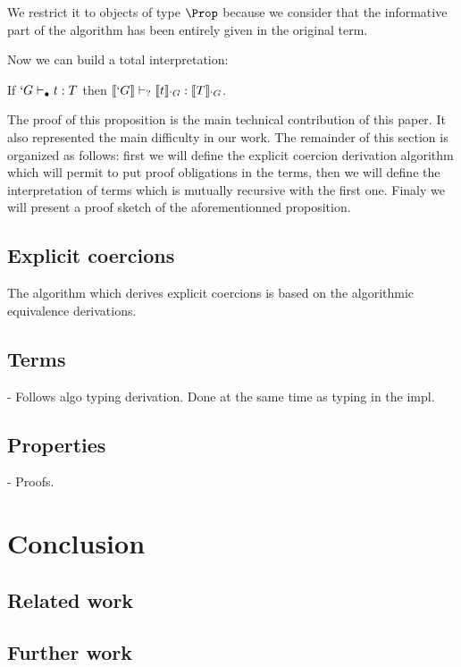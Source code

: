 \documentclass{llncs}
\begin{document}
We restrict it to objects of type $\Prop$ because we consider that the
informative part of the algorithm has been entirely given in the
original term. 

Now we can build a total interpretation:
\begin{proposition}
  If $`G \vdash_{\bullet} t : T$ then $\llbracket `G \rrbracket \vdash_{?} \llbracket t \rrbracket_{`G} : \llbracket T \rrbracket_{`G}$.
\end{proposition}

The proof of this proposition is the main technical contribution of this
paper. It also represented the main difficulty in our work. 
The remainder of this section is organized as follows: first we will
define the explicit coercion derivation algorithm which will permit to
put proof obligations in the terms, then we will define the
interpretation of terms which is mutually recursive with the first
one. Finaly we will present a proof sketch of the aforementionned
proposition.

\subsection{Explicit coercions}
The algorithm which derives explicit coercions is based on the
algorithmic equivalence derivations. 

\subsection{Terms}
- Follows algo typing derivation. Done at the same time as typing in the
impl.

\subsection{Properties}
- Proofs.

\section{Conclusion}
\subsection{Related work}

\subsection{Further work}




\renewcommand{\thefootnote}{}
\end{document}
